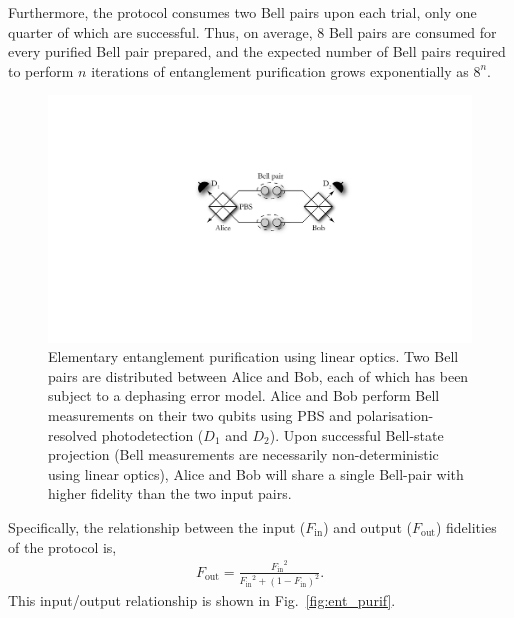 \documentclass[aps,rmp,twocolumn,amsmath,amssymb,nofootinbib,superscriptaddress]{revtex4}
\begin{document}
Furthermore, the protocol consumes two Bell pairs upon each trial, only one quarter of which are successful. Thus, on average, 8 Bell pairs are consumed for every purified Bell pair prepared, and the expected number of Bell pairs required to perform $n$ iterations of entanglement purification grows exponentially as $8^n$.

\begin{figure}[!htb]
\includegraphics[width=0.9\columnwidth]{ent_purif_prot}
\caption{Elementary entanglement purification using linear optics. Two Bell pairs are distributed between Alice and Bob, each of which has been subject to a dephasing error model. Alice and Bob perform Bell measurements on their two qubits using PBS and polarisation-resolved photodetection ($D_1$ and $D_2$). Upon successful Bell-state projection (Bell measurements are necessarily non-deterministic using linear optics), Alice and Bob will share a single Bell-pair with higher fidelity than the two input pairs.} \label{fig:ent_purif_prot}
\end{figure}

Specifically, the relationship between the input ($F_\mathrm{in}$) and output ($F_\mathrm{out}$) fidelities of the protocol is,
\begin{align}
F_\mathrm{out} = \frac{{F_\mathrm{in}}^2}{{F_\mathrm{in}}^2 + (1-F_\mathrm{in})^2}.
\end{align}
This input/output relationship is shown in Fig.~\ref{fig:ent_purif}.
\end{document}
